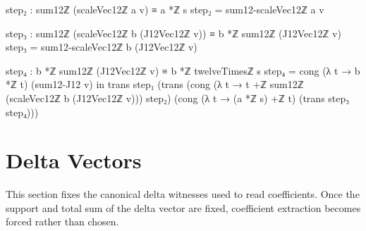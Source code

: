 \documentclass[11pt,a4paper]{book}
\begin{document}
\begin{code}
    step₂ : sum12ℤ (scaleVec12ℤ a v) ≡ a *ℤ s
    step₂ = sum12-scaleVec12ℤ a v

    step₃ : sum12ℤ (scaleVec12ℤ b (J12Vec12ℤ v)) ≡ b *ℤ sum12ℤ (J12Vec12ℤ v)
    step₃ = sum12-scaleVec12ℤ b (J12Vec12ℤ v)

    step₄ : b *ℤ sum12ℤ (J12Vec12ℤ v) ≡ b *ℤ twelveTimesℤ s
    step₄ = cong (λ t → b *ℤ t) (sum12-J12 v)
  in
  trans
    step₁
    (trans
      (cong (λ t → t +ℤ sum12ℤ (scaleVec12ℤ b (J12Vec12ℤ v))) step₂)
      (cong (λ t → (a *ℤ s) +ℤ t) (trans step₃ step₄)))
\end{code}

\section{Delta Vectors}

This section fixes the canonical delta witnesses used to read coefficients.
Once the support and total sum of the delta vector are fixed, coefficient
extraction becomes forced rather than chosen.
\end{document}
